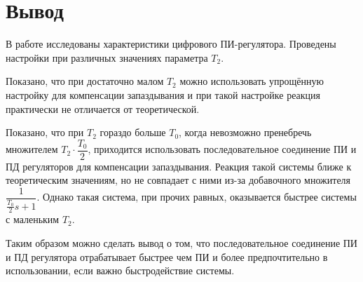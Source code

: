     \section{Вывод}
        В работе исследованы характеристики цифрового ПИ-регулятора. Проведены настройки при различных значениях параметра $ T_2 $.
        
        Показано, что при достаточно малом $ T_2 $ можно использовать упрощённую настройку для компенсации запаздывания и при такой настройке реакция практически не отличается от теоретической.
        
        Показано, что при $ T_2 $ гораздо больше $ T_0 $, когда невозможно пренебречь множителем $ T_2\cdot\dfrac{T_0}{2} $, приходится использовать последовательное соединение ПИ и ПД регуляторов для компенсации запаздывания. Реакция такой системы ближе к теоретическим значениям, но не совпадает с ними из-за добавочного множителя $ \dfrac{1}{\frac{T_0}{2}s+1} $. Однако такая система, при прочих равных, оказывается быстрее системы с маленьким $ T_2 $.
        
        Таким образом можно сделать вывод о том, что последовательное соединение ПИ и ПД регулятора отрабатывает быстрее чем ПИ и более предпочтительно в использовании, если важно быстродействие системы.






























